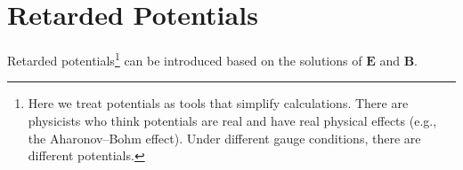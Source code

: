 \documentclass[11pt]{article}              %
\begin{document}



\section[Retarded Potentials]{Retarded Potentials
   }\label{sectionRetardedPotentials}
Retarded potentials\footnote{Here we treat potentials as tools that simplify calculations. There are physicists who think potentials are real and have real physical effects (e.g., the Aharonov–Bohm effect). Under different gauge conditions, there are different potentials.} can be introduced based on the solutions of ${\mathbf E}$ and ${\mathbf B}$.
\end{document}
